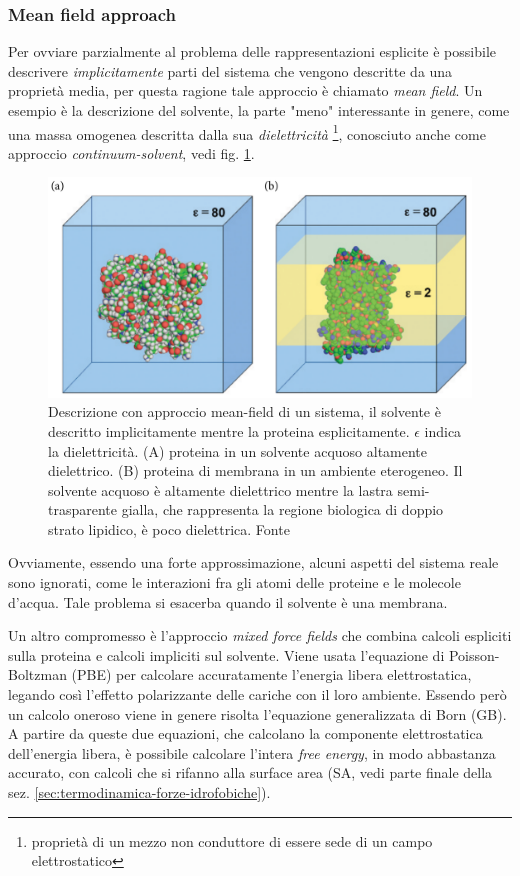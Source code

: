 {\subsubsection{Mean field approach}
Per ovviare parzialmente al problema delle rappresentazioni esplicite è possibile descrivere \textit{implicitamente} parti del sistema che vengono descritte da una proprietà media, per questa ragione tale approccio è chiamato \textit{mean field}. Un esempio è la descrizione del solvente, la parte "meno" interessante in genere, come una massa omogenea descritta dalla sua \textit{dielettricità} \footnote{proprietà di un mezzo non conduttore di essere sede di un campo elettrostatico}, conosciuto anche come approccio \textit{continuum-solvent}, vedi fig. \ref{fig:mean-field}.

\begin{figure}[!htb]
	\centering
	\includegraphics[scale=0.4]{images/mean-field.png}
	\caption{Descrizione con approccio mean-field di un sistema, il solvente è descritto implicitamente mentre la proteina esplicitamente. $\epsilon$ indica la dielettricità. (A) proteina in un solvente acquoso altamente dielettrico. (B) proteina di membrana in un ambiente eterogeneo. Il solvente acquoso è altamente dielettrico mentre la lastra semi-trasparente gialla, che rappresenta la regione biologica di doppio strato lipidico, è poco dielettrica. Fonte\cite{kessel_ben-tal_2018}}
	\label{fig:mean-field}
\end{figure}

Ovviamente, essendo una forte approssimazione, alcuni aspetti del sistema reale sono ignorati, come le interazioni fra gli atomi delle proteine e le molecole d'acqua. Tale problema si esacerba quando il solvente è una membrana. \\

\par Un altro compromesso è l'approccio \textit{mixed force fields} che combina calcoli espliciti sulla proteina e calcoli impliciti sul solvente. Viene usata l'equazione di Poisson-Boltzman (PBE) per calcolare accuratamente l'energia libera elettrostatica, legando così l'effetto polarizzante delle cariche con il loro ambiente. Essendo però un calcolo oneroso viene in genere risolta l'equazione generalizzata di Born (GB). A partire da queste due equazioni, che calcolano la componente elettrostatica dell'energia libera, è possibile calcolare l'intera \textit{free energy}, in modo abbastanza accurato, con calcoli che si rifanno alla surface area (SA, vedi parte finale della sez. \ref{sec:termodinamica-forze-idrofobiche}). 

}
